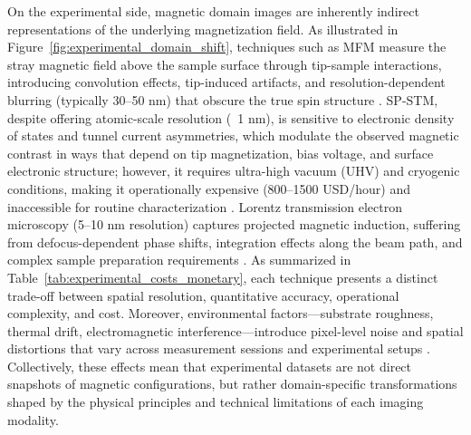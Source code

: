 \documentclass[letterpaper, 12, one column]{article}
\begin{document}
On the experimental side, magnetic domain images are inherently indirect representations of the underlying magnetization field. As illustrated in Figure~\ref{fig:experimental_domain_shift}, techniques such as MFM measure the stray magnetic field above the sample surface through tip-sample interactions, introducing convolution effects, tip-induced artifacts, and resolution-dependent blurring (typically 30–50 nm) that obscure the true spin structure \cite{Jaber2023Magnetic}. SP-STM, despite offering atomic-scale resolution (~1 nm), is sensitive to electronic density of states and tunnel current asymmetries, which modulate the observed magnetic contrast in ways that depend on tip magnetization, bias voltage, and surface electronic structure; however, it requires ultra-high vacuum (UHV) and cryogenic conditions, making it operationally expensive (800–1500 USD/hour) and inaccessible for routine characterization \cite{Odobesko2024STM}. Lorentz transmission electron microscopy (5–10 nm resolution) captures projected magnetic induction, suffering from defocus-dependent phase shifts, integration effects along the beam path, and complex sample preparation requirements \cite{Plitzko2024Lorentz}. As summarized in Table~\ref{tab:experimental_costs_monetary}, each technique presents a distinct trade-off between spatial resolution, quantitative accuracy, operational complexity, and cost. Moreover, environmental factors—substrate roughness, thermal drift, electromagnetic interference—introduce pixel-level noise and spatial distortions that vary across measurement sessions and experimental setups \cite{Mukhatov2023Comprehensive}. Collectively, these effects mean that experimental datasets are not direct snapshots of magnetic configurations, but rather domain-specific transformations shaped by the physical principles and technical limitations of each imaging modality.
\end{document}
